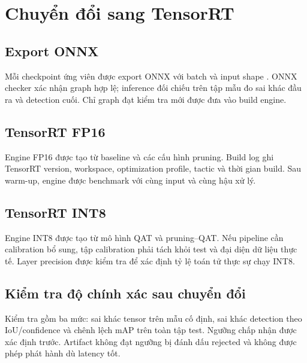 \section{Chuyển đổi sang TensorRT}

\subsection{Export ONNX}

Mỗi checkpoint ứng viên được export ONNX với batch và input shape
. ONNX checker xác nhận graph hợp lệ; inference đối chiếu trên tập
mẫu đo sai khác đầu ra và detection cuối. Chỉ graph đạt kiểm tra mới được đưa vào
build engine.

\subsection{TensorRT FP16}

Engine FP16 được tạo từ baseline và các cấu hình pruning. Build log ghi TensorRT
version, workspace, optimization profile, tactic và thời gian build. Sau warm-up,
engine được benchmark với cùng input và cùng hậu xử lý.

\subsection{TensorRT INT8}

Engine INT8 được tạo từ mô hình QAT và pruning--QAT. Nếu pipeline cần
calibration bổ sung, tập calibration phải tách khỏi test và đại diện dữ liệu thực tế.
Layer precision được kiểm tra để xác định tỷ lệ toán tử thực sự chạy INT8.

\subsection{Kiểm tra độ chính xác sau chuyển đổi}

Kiểm tra gồm ba mức: sai khác tensor trên mẫu cố định, sai khác detection theo
IoU/confidence và chênh lệch mAP trên toàn tập test. Ngưỡng chấp nhận được xác
định trước. Artifact không đạt ngưỡng bị đánh dấu rejected và không được phép
phát hành dù latency tốt.